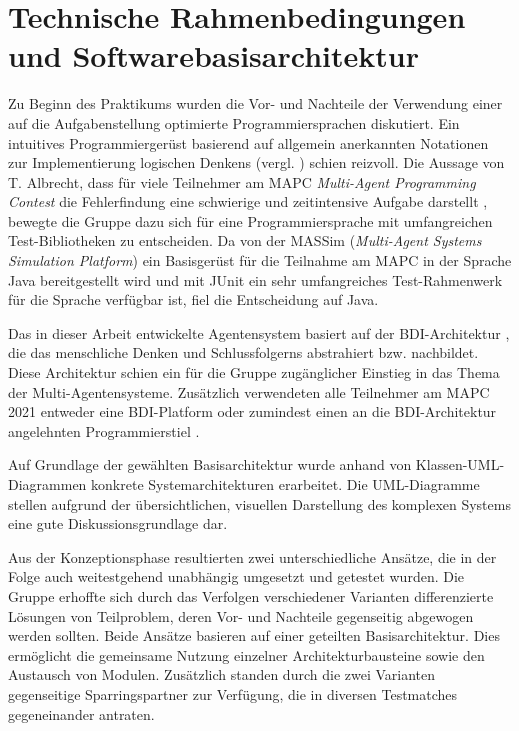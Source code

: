 \documentclass[runningheads]{llncs}
\begin{document}
	\section{Technische Rahmenbedingungen und Softwarebasisarchitektur}
	Zu Beginn des Praktikums wurden die Vor- und Nachteile der Verwendung einer auf die Aufgabenstellung optimierte Programmiersprachen diskutiert. Ein intuitives Programmiergerüst basierend auf allgemein anerkannten Notationen zur Implementierung logischen Denkens (vergl. \cite{Goal}) schien reizvoll. Die Aussage von T. Albrecht, dass für viele Teilnehmer am MAPC \textit{Multi-Agent Programming Contest} die Fehlerfindung eine schwierige und zeitintensive Aufgabe darstellt \cite[S. 17]{Ahlbrecht2021}, bewegte die Gruppe dazu sich für eine Programmiersprache mit umfangreichen Test-Bibliotheken zu entscheiden. Da von der MASSim (\textit{Multi-Agent Systems Simulation Platform}) ein Basisgerüst für die Teilnahme am MAPC in der Sprache Java bereitgestellt wird und mit JUnit \cite{JUnit} ein sehr umfangreiches Test-Rahmenwerk für die Sprache verfügbar ist, fiel die Entscheidung auf Java. 
	
	
	Das in dieser Arbeit entwickelte Agentensystem basiert auf der BDI-Architektur \cite{Bratman1987}, die das menschliche Denken und Schlussfolgerns abstrahiert bzw. nachbildet. Diese Architektur schien ein für die Gruppe zugänglicher Einstieg in das Thema der Multi-Agentensysteme. Zusätzlich verwendeten alle Teilnehmer am MAPC 2021 entweder eine BDI-Platform oder zumindest einen an die BDI-Architektur angelehnten Programmierstiel \cite[S. 10]{Ahlbrecht2021}.
	
	Auf Grundlage der gewählten Basisarchitektur wurde anhand von Klassen-UML-Diagrammen konkrete Systemarchitekturen erarbeitet. Die UML-Diagramme stellen aufgrund der übersichtlichen, visuellen Darstellung des komplexen Systems eine gute Diskussionsgrundlage dar.
	
	Aus der Konzeptionsphase resultierten zwei unterschiedliche Ansätze, die in der Folge auch weitestgehend unabhängig umgesetzt und getestet wurden. Die Gruppe erhoffte sich durch das Verfolgen verschiedener Varianten differenzierte Lösungen von Teilproblem, deren Vor- und Nachteile gegenseitig abgewogen werden sollten. Beide Ansätze basieren auf einer geteilten Basisarchitektur. Dies ermöglicht die gemeinsame Nutzung einzelner Architekturbausteine sowie den Austausch von Modulen. Zusätzlich standen durch die zwei Varianten gegenseitige Sparringspartner zur Verfügung, die in diversen Testmatches gegeneinander antraten.
	
\end{document}
